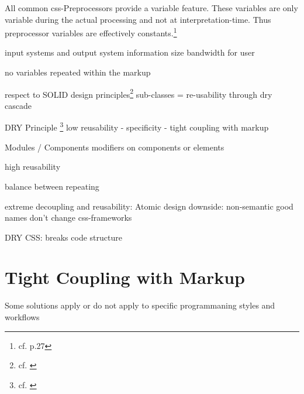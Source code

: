 All common \gls{css}-Preprocessors provide a variable feature.
These variables are only variable during the actual processing and not at interpretation-time.
Thus preprocessor variables are effectively constants.\footnote{cf. \cite{wirthpreprocessors} p.27}

input systems and output system
information size
bandwidth for user



no variables
repeated within the markup

respect to SOLID design principles\footnote{cf. \cite{solidcss}}
sub-classes = re-usability through dry
cascade

DRY Principle \footnote{cf. \cite{pragmaticprogrammer}}
low reusability
- specificity
- tight coupling with markup

Modules / Components
modifiers on components or elements

high reusability

balance between repeating 

extreme decoupling and reusability: Atomic design
downside: non-semantic
good names don't change
css-frameworks

DRY CSS: breaks code structure

\section{Tight Coupling with Markup}
Some solutions apply or do not apply to specific programmaning styles and workflows
